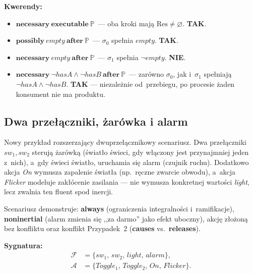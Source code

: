 \documentclass[11pt,a4paper]{article}
\newif\ifshowbib
\newcommand{\bibonly}[1]{\ifshowbib#1\fi}
\renewcommand{\cite}[2][]{\unskip}%
\newcommand{\causes}{\textbf{causes}}
\newcommand{\aft}{\textbf{after}}
\newcommand{\always}{\textbf{always}}
\newcommand{\releases}{\textbf{releases}}
\newcommand{\noninertial}{\textbf{noninertial}}
\newcommand{\necessary}{\textbf{necessary}}
\newcommand{\possibly}{\textbf{possibly}}
\newcommand{\executable}{\textbf{executable}}
\theoremstyle{definition}
\begin{document}
\medskip
\noindent\textbf{Kwerendy:}
\begin{itemize}
  \item $\necessary\ \executable\ \mathbb{P}$~---
    oba kroki mają $\mathrm{Res} \neq \varnothing$. \textbf{TAK}.

  \item $\possibly\ \mathit{empty}\ \aft\ \mathbb{P}$~---
    $\sigma_0$ spełnia $\mathit{empty}$. \textbf{TAK}.

  \item $\necessary\ \mathit{empty}\ \aft\ \mathbb{P}$~---
    $\sigma_1$ spełnia $\neg\mathit{empty}$. \textbf{NIE}.

  \item $\necessary\ \neg\mathit{hasA} \land \neg\mathit{hasB}\ \aft\ \mathbb{P}$~---
    zarówno $\sigma_0$, jak i~$\sigma_1$ spełniają $\neg\mathit{hasA} \land \neg\mathit{hasB}$.
    \textbf{TAK} --- niezależnie od~przebiegu, po procesie żaden konsument
    nie ma produktu.
\end{itemize}

\subsection{Dwa przełączniki, żarówka i alarm}

\noindent Nowy przykład rozszerzający dwuprzełącznikowy scenariusz\bibonly{ z~\cite{rw02}}.
Dwa przełączniki $\mathit{sw_1}, \mathit{sw_2}$ sterują żarówką (światło świeci,
gdy włączony jest przynajmniej jeden z~nich), a~gdy świeci światło, uruchamia
się alarm (czujnik ruchu). Dodatkowo akcja \textit{On} wymusza zapalenie
światła (np.\ ręczne zwarcie obwodu), a~akcja \textit{Flicker} modeluje
zakłócenie zasilania --- nie wymusza konkretnej wartości \textit{light},
lecz zwalnia ten fluent spod inercji.

Scenariusz demonstruje: \always{} (ograniczenia integralności i~ramifikacje),
\noninertial{} (alarm zmienia się ,,za darmo'' jako efekt uboczny),
akcję złożoną bez konfliktu oraz konflikt Przypadek~2 (\causes{} vs.\ \releases{}).

\medskip
\noindent\textbf{Sygnatura:}
\begin{align*}
  \mathcal{F} &= \{\mathit{sw_1},\, \mathit{sw_2},\, \mathit{light},\, \mathit{alarm}\}, \\
  \mathcal{A} &= \{\mathit{Toggle_1},\, \mathit{Toggle_2},\, \mathit{On},\, \mathit{Flicker}\}.
\end{align*}
\end{document}
